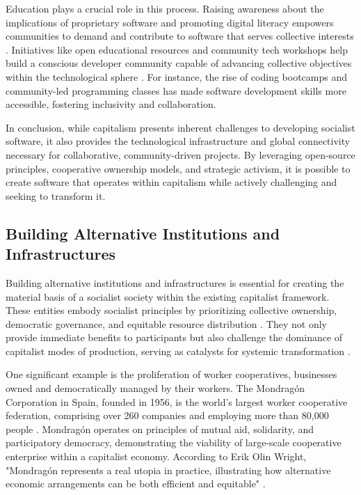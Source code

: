 \begin{refsection}
Education plays a crucial role in this process. Raising awareness about the implications of proprietary software and promoting digital literacy empowers communities to demand and contribute to software that serves collective interests \cite[pp.~200-202]{Freire2000}. Initiatives like open educational resources and community tech workshops help build a conscious developer community capable of advancing collective objectives within the technological sphere \cite[pp.~85-88]{Coleman2013}. For instance, the rise of coding bootcamps and community-led programming classes has made software development skills more accessible, fostering inclusivity and collaboration.

In conclusion, while capitalism presents inherent challenges to developing socialist software, it also provides the technological infrastructure and global connectivity necessary for collaborative, community-driven projects. By leveraging open-source principles, cooperative ownership models, and strategic activism, it is possible to create software that operates within capitalism while actively challenging and seeking to transform it.

\subsection{Building Alternative Institutions and Infrastructures}

Building alternative institutions and infrastructures is essential for creating the material basis of a socialist society within the existing capitalist framework. These entities embody socialist principles by prioritizing collective ownership, democratic governance, and equitable resource distribution \cite[pp.~52-55]{Gramsci1971}. They not only provide immediate benefits to participants but also challenge the dominance of capitalist modes of production, serving as catalysts for systemic transformation \cite[pp.~71-74]{Wright2010}.

One significant example is the proliferation of worker cooperatives, businesses owned and democratically managed by their workers. The Mondragón Corporation in Spain, founded in 1956, is the world's largest worker cooperative federation, comprising over 260 companies and employing more than 80,000 people \cite[pp.~120-122]{Whyte1991}. Mondragón operates on principles of mutual aid, solidarity, and participatory democracy, demonstrating the viability of large-scale cooperative enterprise within a capitalist economy. According to Erik Olin Wright, "Mondragón represents a real utopia in practice, illustrating how alternative economic arrangements can be both efficient and equitable" \cite[pp.~72]{Wright2010}.


\end{refsection}
